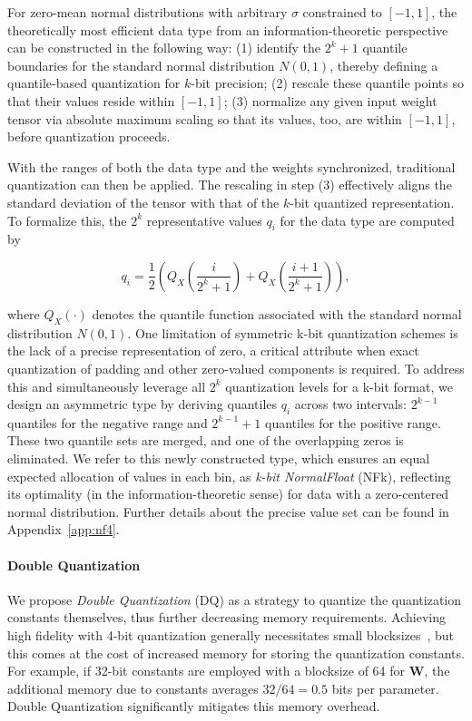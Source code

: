For zero-mean normal distributions with arbitrary $\sigma$ constrained to $[-1, 1]$, the theoretically most efficient data type from an information-theoretic perspective can be constructed in the following way: (1) identify the $2^k+1$ quantile boundaries for the standard normal distribution $N(0, 1)$, thereby defining a quantile-based quantization for $k$-bit precision; (2) rescale these quantile points so that their values reside within $[-1, 1]$; (3) normalize any given input weight tensor via absolute maximum scaling so that its values, too, are within $[-1, 1]$, before quantization proceeds.

With the ranges of both the data type and the weights synchronized, traditional quantization can then be applied. The rescaling in step (3) effectively aligns the standard deviation of the tensor with that of the $k$-bit quantized representation. To formalize this, the $2^k$ representative values $q_i$ for the data type are computed by

\begin{equation}
q_i  = \frac{1}{2}\left( Q_X\left(\frac{i}{2^k+1}\right) + Q_X\left(\frac{i+1}{2^k+1}\right)\right),
\end{equation}

where $Q_X(\cdot)$ denotes the quantile function associated with the standard normal distribution $N(0,1)$. One limitation of symmetric k-bit quantization schemes is the lack of a precise representation of zero, a critical attribute when exact quantization of padding and other zero-valued components is required. To address this and simultaneously leverage all $2^k$ quantization levels for a k-bit format, we design an asymmetric type by deriving quantiles $q_i$ across two intervals: $2^{k-1}$ quantiles for the negative range and $2^{k-1}+1$ quantiles for the positive range. These two quantile sets are merged, and one of the overlapping zeros is eliminated. We refer to this newly constructed type, which ensures an equal expected allocation of values in each bin, as \emph{k-bit NormalFloat} (NFk), reflecting its optimality (in the information-theoretic sense) for data with a zero-centered normal distribution. Further details about the precise value set can be found in Appendix~\ref{app:nf4}.

\paragraph{Double Quantization{}}
We propose \emph{Double Quantization} (DQ) as a strategy to quantize the quantization constants themselves, thus further decreasing memory requirements. Achieving high fidelity with 4-bit quantization generally necessitates small blocksizes~\citep{dettmers2022case}, but this comes at the cost of increased memory for storing the quantization constants. For example, if 32-bit constants are employed with a blocksize of 64 for $\mathbf{W}$, the additional memory due to constants averages $32/64 = 0.5$ bits per parameter. Double Quantization significantly mitigates this memory overhead.

